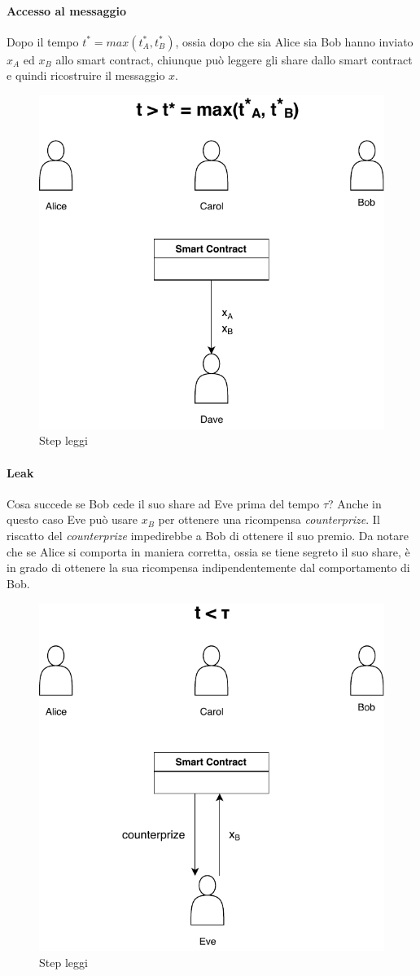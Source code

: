 \paragraph{Accesso al messaggio}
Dopo il tempo $ t^* = max(t^*_A, t^*_B) $, ossia dopo che sia Alice sia Bob
hanno inviato $ x_A $ ed $ x_B $
allo smart contract, chiunque può leggere gli share dallo smart contract e quindi
ricostruire il messaggio $ x $.
\begin{figure}[H]
	\centering
	\includegraphics[width=0.5\linewidth]{images/chap_protocollo/avanzato-leggi.pdf}
	\caption{Step leggi}
\end{figure}

\paragraph{Leak}
Cosa succede se Bob cede il suo share ad Eve prima del tempo $ \tau $?
Anche in questo caso Eve può usare $ x_B $ per ottenere una ricompensa
\textit{counterprize}.
Il riscatto del \textit{counterprize} impedirebbe a Bob di ottenere il suo premio.
Da notare che se Alice si comporta in maniera corretta, ossia se tiene segreto il
suo share, è in grado di ottenere la sua ricompensa indipendentemente dal comportamento
di Bob.
\begin{figure}[H]
	\centering
	\includegraphics[width=0.4\linewidth]{images/chap_protocollo/avanzato-leak-1.pdf}
	\caption{Step leggi}
\end{figure}

